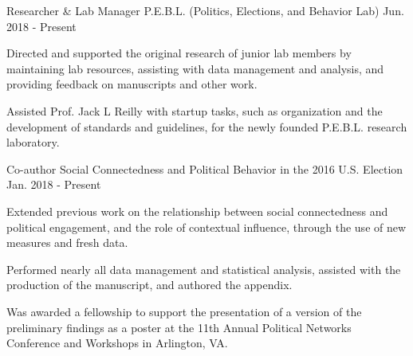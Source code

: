 

\begin{cventries}

    \cventry
      {Researcher \& Lab Manager} %
      {P.E.B.L. (Politics, Elections, and Behavior Lab)} %
      {Jun. 2018 - Present} %
      {} %
      {
        \begin{cvitems} %
          \item {Directed and supported the original research of junior lab members by maintaining lab resources, assisting with data management and analysis, and providing feedback on manuscripts and other work.}
          \item {Assisted Prof. Jack L Reilly with startup tasks, such as organization and the development of standards and guidelines, for the newly founded P.E.B.L. research laboratory.}
      \end{cvitems}
      }


    \cventry
      {Co-author} %
      {Social Connectedness and Political Behavior in the 2016 U.S. Election} %
      {Jan. 2018 - Present} %
      {} %
      {
        \begin{cvitems} %
          \item {Extended previous work on the relationship between social connectedness and political engagement, and the role of contextual influence, through the use of new measures and fresh data.}
          \item {Performed nearly all data management and statistical analysis, assisted with the production of the manuscript, and authored the appendix.}
          \item {Was awarded a fellowship to support the presentation of a version of the preliminary findings as a poster at the 11th Annual Political Networks Conference and Workshops in Arlington, VA.}
        \end{cvitems}
      }



\end{cventries}

